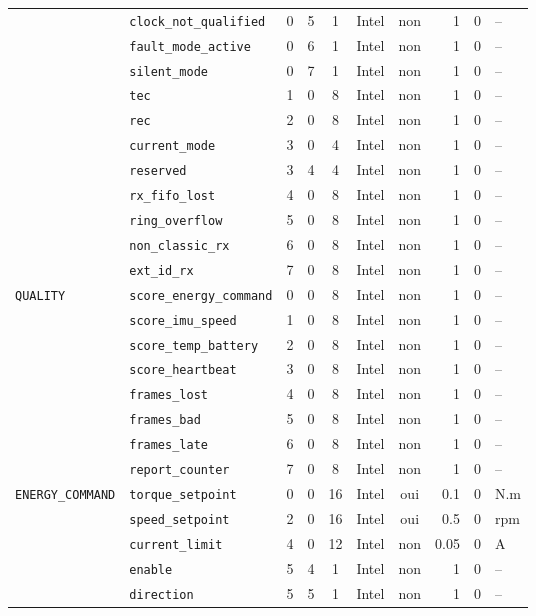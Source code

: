 \begin{longtable}{llrrcccrrl}
 & \texttt{clock\_not\_qualified} & 0 & 5 & 1 & Intel & non & 1 & 0 & -- \\
 & \texttt{fault\_mode\_active} & 0 & 6 & 1 & Intel & non & 1 & 0 & -- \\
 & \texttt{silent\_mode} & 0 & 7 & 1 & Intel & non & 1 & 0 & -- \\
 & \texttt{tec} & 1 & 0 & 8 & Intel & non & 1 & 0 & -- \\
 & \texttt{rec} & 2 & 0 & 8 & Intel & non & 1 & 0 & -- \\
 & \texttt{current\_mode} & 3 & 0 & 4 & Intel & non & 1 & 0 & -- \\
 & \texttt{reserved} & 3 & 4 & 4 & Intel & non & 1 & 0 & -- \\
 & \texttt{rx\_fifo\_lost} & 4 & 0 & 8 & Intel & non & 1 & 0 & -- \\
 & \texttt{ring\_overflow} & 5 & 0 & 8 & Intel & non & 1 & 0 & -- \\
 & \texttt{non\_classic\_rx} & 6 & 0 & 8 & Intel & non & 1 & 0 & -- \\
 & \texttt{ext\_id\_rx} & 7 & 0 & 8 & Intel & non & 1 & 0 & -- \\
\addlinespace
\texttt{QUALITY} & \texttt{score\_energy\_command} & 0 & 0 & 8 & Intel & non & 1 & 0 & -- \\
 & \texttt{score\_imu\_speed} & 1 & 0 & 8 & Intel & non & 1 & 0 & -- \\
 & \texttt{score\_temp\_battery} & 2 & 0 & 8 & Intel & non & 1 & 0 & -- \\
 & \texttt{score\_heartbeat} & 3 & 0 & 8 & Intel & non & 1 & 0 & -- \\
 & \texttt{frames\_lost} & 4 & 0 & 8 & Intel & non & 1 & 0 & -- \\
 & \texttt{frames\_bad} & 5 & 0 & 8 & Intel & non & 1 & 0 & -- \\
 & \texttt{frames\_late} & 6 & 0 & 8 & Intel & non & 1 & 0 & -- \\
 & \texttt{report\_counter} & 7 & 0 & 8 & Intel & non & 1 & 0 & -- \\
\addlinespace
\texttt{ENERGY\_COMMAND} & \texttt{torque\_setpoint} & 0 & 0 & 16 & Intel & oui & 0.1 & 0 & N.m \\
 & \texttt{speed\_setpoint} & 2 & 0 & 16 & Intel & oui & 0.5 & 0 & rpm \\
 & \texttt{current\_limit} & 4 & 0 & 12 & Intel & non & 0.05 & 0 & A \\
 & \texttt{enable} & 5 & 4 & 1 & Intel & non & 1 & 0 & -- \\
 & \texttt{direction} & 5 & 5 & 1 & Intel & non & 1 & 0 & -- \\

\end{longtable}
